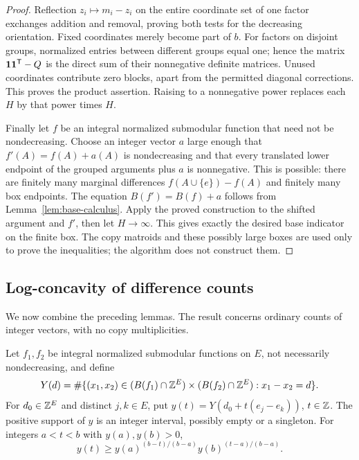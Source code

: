 \begin{proof}
Reflection $z_i\mapsto m_i-z_i$ on the entire coordinate set
of one factor exchanges addition and removal, proving both tests
for the decreasing orientation.  Fixed coordinates merely become
part of $b$.  For factors on disjoint groups, normalized entries
between different groups equal one; hence the matrix
$\mathbf 1\mathbf 1^{\mathsf T}-Q$ is the direct sum of their nonnegative
definite matrices.  Unused coordinates contribute zero blocks,
apart from the permitted diagonal corrections.
This proves the product assertion.  Raising to a nonnegative
power replaces each $H$ by that power times $H$.

Finally let $f$ be an integral normalized submodular function that
need not be nondecreasing.  Choose an integer vector $a$ large
enough that $f'(A)=f(A)+a(A)$ is nondecreasing and that every
translated lower endpoint of the grouped arguments plus $a$ is
nonnegative.  This is possible: there are finitely many marginal
differences $f(A\cup\{e\})-f(A)$ and finitely many box endpoints.
The equation $B(f')=B(f)+a$ follows from
Lemma~\ref{lem:base-calculus}.  Apply the proved construction to
the shifted argument and $f'$, then let $H\to\infty$.
This gives exactly the desired base indicator on the finite box.
The copy matroids and these possibly large boxes are used only
to prove the inequalities; the algorithm does not construct them.
\end{proof}

\subsection{Log-concavity of difference counts}

We now combine the preceding lemmas.  The result concerns ordinary
counts of integer vectors, with no copy multiplicities.

\begin{proposition}
\label{prop:shift-logconcavity}
Let $f_1,f_2$ be integral normalized submodular functions on $E$,
not necessarily nondecreasing, and define
\[
 Y(d)=\#\{(x_1,x_2)\in(B(f_1)\cap\mathbb Z^E)\times
                         (B(f_2)\cap\mathbb Z^E):x_1-x_2=d\}.
\]
For $d_0\in\mathbb Z^E$ and distinct $j,k\in E$, put
$y(t)=Y(d_0+t(e_j-e_k))$, $t\in\mathbb Z$.
The positive support of $y$ is an integer interval, possibly
empty or a singleton.  For integers $a<t<b$ with
$y(a),y(b)>0$,
\begin{equation}
 y(t)\ge y(a)^{(b-t)/(b-a)}y(b)^{(t-a)/(b-a)}.
 \label{eq:shift-interpolation}
\end{equation}
\end{proposition}

